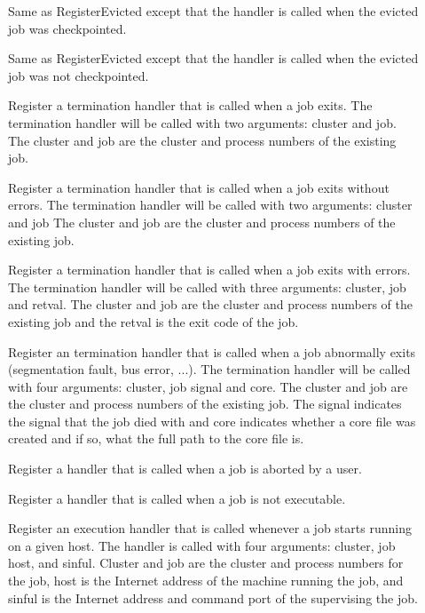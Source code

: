 \begin{description}
	\item []
	Same as RegisterEvicted except that the handler is called when the 
	evicted job was checkpointed.

	\item []
	Same as RegisterEvicted except that the handler is called when the
	evicted job was not checkpointed.

	\item []
	Register a termination handler that is called when a job exits.
	The termination handler will be called with two arguments: cluster and
	job. The cluster and job are the cluster and process numbers of the
	existing job. 
	
	\item []
	Register a termination handler that is called when a job exits without
	errors. The termination handler will be called with two arguments: 
	cluster and job  The cluster and job are the cluster and process
	numbers of the existing job. 

	\item []
	Register a termination handler that is called when a job exits with 
	errors. The termination handler will be called with three arguments:
	cluster, job and retval. The cluster and job are the cluster 
	and process numbers of the existing job and the retval is the exit
	code of the job.

	\item []
	Register an termination handler that is called when a job abnormally
	exits (segmentation fault, bus error, ...). The termination handler
	will be called with four arguments: cluster, job  signal and
	core. The cluster and job are the cluster and process numbers of 
	the existing job. The signal indicates the signal that the job
	died with and core indicates whether a core file was created and if 
	so, what the full path to the core file is.

	\item []
	Register a handler that is called when a job is aborted by a user.

	\item []
	Register a handler that is called when a job is not executable.

	\item []
	Register an execution handler that is called whenever a job starts
	running on a given host.  The handler is called with four arguments:
	cluster, job  host, and sinful.  Cluster and job are the cluster and
	process numbers for the job, host is the Internet address of the
	machine running the job, and sinful is the Internet address and 
	command port of the  supervising the job.


\end{description}
